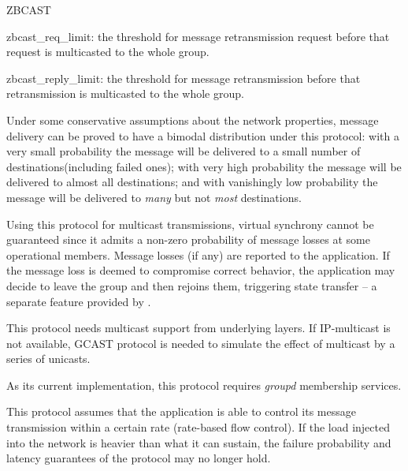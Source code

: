 \begin{Layer}{ZBCAST}
\begin{Parameters}
\item zbcast\_req\_limit: the threshold for message retransmission
request before that request is multicasted to the whole group.

\item zbcast\_reply\_limit: the threshold for message retransmission
before that retransmission is multicasted to the whole group.
\end{Parameters}

\begin{Properties}
\item
Under some conservative assumptions about the network properties,
message delivery can be proved to have a bimodal distribution under
this protocol: with a very small probability the message will be
delivered to a small number of destinations(including failed ones);
with very high probability the message will be delivered to almost all
destinations; and with vanishingly low probability the message will be
delivered to \emph{many} but not \emph{most} destinations.

\item
Using this protocol for multicast transmissions, virtual synchrony
cannot be guaranteed since it admits a non-zero probability of message
losses at some operational members.  Message losses (if any) are
reported to the application.  If the message loss is deemed to
compromise correct behavior, the application may decide to leave the
group and then rejoins them, triggering state transfer -- a separate
feature provided by \ensemble.

\item
This protocol needs multicast support from underlying layers.  If
IP-multicast is not available, GCAST protocol is needed to simulate
the effect of multicast by a series of unicasts.

\item
As its current implementation, this protocol requires \emph{groupd}
membership services.

\item
This protocol assumes that the application is able to control its
message transmission within a certain rate (rate-based flow control).
If the load injected into the network is heavier than what it can
sustain, the failure probability and latency guarantees of the
protocol may no longer hold.
\end{Properties}

\begin{Sources}
\end{Sources}


\end{Layer}

